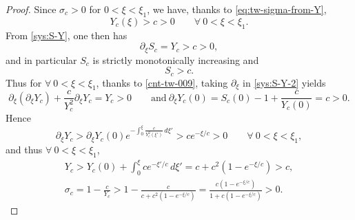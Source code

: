 \documentclass[12pt]{article}
\theoremstyle{definition}
\theoremstyle{remark}
\numberwithin{equation}{section}
\begin{document}

\begin{proof}

Since $ \sigma_c > 0 $ for $ 0 < \xi < \xi_1 $, we have, thanks to \eqref{eq:tw-sigma-from-Y}, 
\begin{equation}
    \label{cnt-tw-009}
    Y_c(\xi) > c > 0 \qquad \forall \ 0 < \xi < \xi_1. 
\end{equation}
From \eqref{sys:S-Y}, one then has
\begin{equation}
    \label{cnt-tw-010}
    \partial_\xi S_c = Y_c > c > 0,
\end{equation}
and in particular $ S_c $ is strictly monotonically increasing and 
\begin{equation}
\label{cnt-tw-010-1}
    S_c > c.
\end{equation}
Thus for $ \forall \ 0 <  \xi < \xi_1 $, thanks to \eqref{cnt-tw-009}, taking $ \partial_\xi $ in \eqref{sys:S-Y-2} yields
\begin{equation}
    \label{cnt-tw-012}
    \partial_\xi(\partial_\xi Y_c) + \frac{c}{Y_c^2} \partial_\xi Y_c = Y_c > 0 \qquad \text{and} \ \partial_\xi Y_c(0) = S_c(0) - 1 + \frac{c}{Y_c(0)} = c > 0.
\end{equation}
Hence 
\begin{equation}
    \label{cnt-tw-013}
    \partial_\xi Y_c > \partial_\xi Y_c(0) e^{-\int_0^\xi \frac{c}{Y_c^2(\xi')}\,d\xi'} > ce^{-\xi/c} > 0 \qquad \forall \ 0 < \xi < \xi_1,
\end{equation}
and thus $ \forall \ 0 < \xi < \xi_1 $,
\begin{gather}
    \label{cnt-tw-013}
    Y_c > Y_c(0) + \int_0^\xi c e^{-\xi'/c}\,d\xi' = c + c^2 (1-e^{-\xi/c}) > c, \\ %
    \label{cnt-tw-014}
    \sigma_c = 1- \frac{c}{Y_c}> 1 - \frac{c}{c + c^2(1-e^{-\xi/c})} = \frac{c(1-e^{-\xi/c})}{1 + c(1-e^{-\xi/c})} > 0.
\end{gather}


\end{proof}
\end{document}
